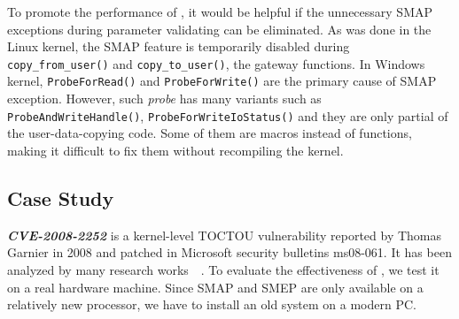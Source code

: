 



To promote the performance of \name, it would be helpful if  the unnecessary SMAP exceptions during parameter validating can be eliminated. As was done in the Linux kernel, the SMAP feature is temporarily disabled during \texttt{copy\_from\_user()} and \texttt{copy\_to\_user()}, the gateway functions. In Windows kernel, \texttt{ProbeForRead()} and \texttt{ProbeForWrite()} are the primary cause of SMAP exception. However, such \textit{probe} has many variants such as \texttt{ProbeAndWriteHandle()}, \texttt{ProbeForWriteIoStatus()} and they are only partial of the user-data-copying code. Some of them are macros instead of functions, making it difficult to fix them without recompiling the kernel. 

\subsection{Case Study}


\textbf{\textit{CVE-2008-2252}} is a kernel-level TOCTOU vulnerability reported by Thomas Garnier in 2008 and patched in Microsoft security bulletins ms08-061.  It has been analyzed by many research works~\cite{wang2019dftracker}~\cite{jurczyk2013identifying}. To evaluate the effectiveness of \name, we test it on a real hardware machine. Since SMAP and SMEP are only available on a relatively new processor, we have to install an old system on a modern PC. 



